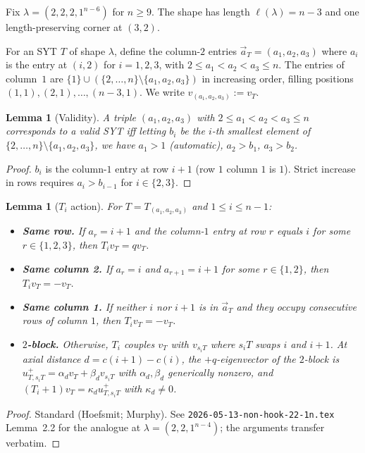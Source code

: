 \documentclass[11pt]{article}
\newtheorem{lemma}[theorem]{Lemma}
\theoremstyle{definition}
\begin{document}
Fix $\lambda=(2,2,2,1^{n-6})$ for $n\ge 9$.  The shape has length
$\ell(\lambda)=n-3$ and one length-preserving corner at $(3,2)$.

For an SYT $T$ of shape $\lambda$, define the column-$2$ entries
$\vec{a}_T=(a_1,a_2,a_3)$ where $a_i$ is the entry at $(i,2)$ for
$i=1,2,3$, with $2\le a_1<a_2<a_3\le n$.  The entries of column~$1$
are $\{1\}\cup(\{2,\ldots,n\}\setminus\{a_1,a_2,a_3\})$ in
increasing order, filling positions $(1,1),(2,1),\ldots,(n-3,1)$.
We write $v_{(a_1,a_2,a_3)}:=v_T$.

\begin{lemma}[Validity]\label{lem:syt-validity}
A triple $(a_1,a_2,a_3)$ with $2\le a_1<a_2<a_3\le n$ corresponds
to a valid SYT iff letting $b_i$ be the $i$-th smallest element of
$\{2,\ldots,n\}\setminus\{a_1,a_2,a_3\}$, we have
$a_1>1$ (automatic), $a_2>b_1$, $a_3>b_2$.
\end{lemma}

\begin{proof}
$b_i$ is the column-$1$ entry at row $i+1$ (row $1$ column $1$ is
$1$).  Strict increase in rows requires
$a_i>b_{i-1}$ for $i\in\{2,3\}$.
\end{proof}

\begin{lemma}[$T_i$ action]\label{lem:Ti-action}
For $T=T_{(a_1,a_2,a_3)}$ and $1\le i\le n-1$:
\begin{itemize}[leftmargin=2em,topsep=0.3em,itemsep=0.2em]
\item \textbf{Same row.} If $a_r=i+1$ and the column-$1$ entry at
row $r$ equals $i$ for some $r\in\{1,2,3\}$, then $T_iv_T=qv_T$.
\item \textbf{Same column 2.}  If $a_r=i$ and $a_{r+1}=i+1$ for some
$r\in\{1,2\}$, then $T_iv_T=-v_T$.
\item \textbf{Same column 1.}  If neither $i$ nor $i+1$ is in
$\vec{a}_T$ and they occupy consecutive rows of column $1$, then
$T_iv_T=-v_T$.
\item \textbf{$2$-block.}  Otherwise, $T_i$ couples $v_T$ with
$v_{s_iT}$ where $s_iT$ swaps $i$ and $i{+}1$.  At axial distance
$d=c(i{+}1)-c(i)$, the $+q$-eigenvector of the $2$-block is
$u^+_{T,s_iT}=\alpha_dv_T+\beta_dv_{s_iT}$ with $\alpha_d,\beta_d$
generically nonzero, and $(T_i{+}1)v_T=\kappa_du^+_{T,s_iT}$
with $\kappa_d\ne 0$.
\end{itemize}
\end{lemma}

\begin{proof}
Standard (Hoefsmit; Murphy).  See \texttt{2026-05-13-non-hook-22-1n.tex}
Lemma~2.2 for the analogue at $\lambda=(2,2,1^{n-4})$; the
arguments transfer verbatim.
\end{proof}
\end{document}

